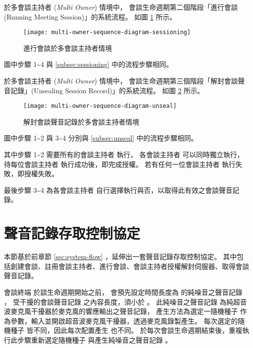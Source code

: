     於多會談主持者 ({\it Multi Owner}) 情境中，
會談生命週期第二個階段「進行會談 (Running Meeting Session)」的系統流程。
如圖 \ref{fig:m-o-sessioning} 所示。

\begin{figure}[H]
    \centering
    \texttt{[image: multi-owner-sequence-diagram-sessioning]}
    \caption{進行會談於多會談主持者情境}\label{fig:m-o-sessioning}
\end{figure}

    圖中步驟 1\textasciitilde4 與
\ref{subsec:sessioning}  中的流程步驟相同。

    於多會談主持者 ({\it Multi Owner}) 情境中，
會談生命週期第三個階段「解封會談聲音記錄」(Unsealing Session Record)」的系統流程。
如圖 \ref{fig:m-o-unseal} 所示。

\begin{figure}[H]
    \centering
    \texttt{[image: multi-owner-sequence-diagram-unseal]}
    \caption{解封會談聲音記錄於多會談主持者情境}\label{fig:m-o-unseal}
\end{figure}

    圖中步驟 1\textasciitilde2 與 3\textasciitilde4
分別與 \ref{subsec:unseal}  中的流程步驟相同。

    其中步驟 1\textasciitilde2 需要所有的會談主持者 \DEFownerAll 執行，
各會談主持者 \DEFowner 可以同時獨立執行，待每位會談主持者 \DEFowner 執行成功後，即完成授權。
若有任何一位會談主持者 \DEFowner 執行失敗，即授權失敗。

    最後步驟 3\textasciitilde4 為各會談主持者 \DEFowner 自行選擇執行與否，以取得此有效之會談聲音記錄。


\section{聲音記錄存取控制協定}\label{sec:protocol}

    本節基於前章節 \ref{sec:system-flow} ，延伸出一套聲音記錄存取控制協定。
其中包括創建會談、註冊會談主持者、進行會談、會談主持者授權解封伺服器、取得會談聲音記錄。

    會談終端 \DEFmeetingbox 於談生命週期開始之前，
會預先設定時間長度為 \DEFtimeMAX 的純噪音之聲音記錄 \DEFrecN，
受干擾的會談聲音記錄 \DEFrecJ 之內容長度，須小於 \DEFtimeMAX。
此純噪音之聲音記錄 \DEFrecN 為純超音波麥克風干擾器於麥克風的響應輸出之聲音記錄，
產生方法為選定一隨機種子 \DEFseed 作為參數，輸入並開啟超音波麥克風干擾器，透過麥克風錄製產生。
每次選定的隨機種子 \DEFseed 皆不同，因此每次配置產生 \DEFrecN 也不同。
於每次會談生命週期結束後，重複執行此步驟重新選定隨機種子 \DEFseed 與產生純噪音之聲音記錄 \DEFrecN。


